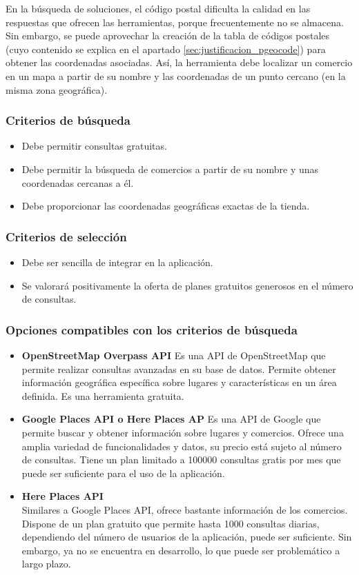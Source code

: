 En la búsqueda de soluciones, el código postal dificulta la calidad en las respuestas que ofrecen las herramientas, porque frecuentemente no se almacena. Sin embargo, se puede aprovechar la creación de la tabla de códigos postales (cuyo contenido se explica en el apartado \ref{sec:justificacion_pgeocode}) para obtener las coordenadas asociadas. Así, la herramienta debe localizar un comercio en un mapa a partir de su nombre y las coordenadas de un punto cercano (en la misma zona geográfica).

\subsubsection{Criterios de búsqueda}
\begin{itemize}
    \item Debe permitir consultas gratuitas.
    \item Debe permitir la búsqueda de comercios a partir de su nombre y unas coordenadas cercanas a él.
    \item Debe proporcionar las coordenadas geográficas exactas de la tienda.
\end{itemize}

\subsubsection{Criterios de selección}
\begin{itemize}
    \item Debe ser sencilla de integrar en la aplicación.
    \item Se valorará positivamente la oferta de planes gratuitos generosos en el número de consultas.
\end{itemize}

\subsubsection{Opciones compatibles con los criterios de búsqueda}
\begin{itemize}
    \item \textbf{OpenStreetMap Overpass API}
    Es una API de OpenStreetMap que permite realizar consultas avanzadas en su base de datos. Permite obtener información geográfica específica sobre lugares y características en un área definida. Es una herramienta gratuita.
    \item \textbf{Google Places API o Here Places AP}
    Es una API de Google que permite buscar y obtener información sobre lugares y comercios. Ofrece una amplia variedad de funcionalidades y datos, su precio está sujeto al número de consultas. Tiene un plan limitado a 100000 consultas gratis por mes que puede ser suficiente para el uso de la aplicación\cite{google_places_api}.
    \item \textbf{Here Places API}\\
    Similares a Google Places API, ofrece bastante información de los comercios. Dispone de un plan gratuito que permite hasta 1000 consultas diarias, dependiendo del número de usuarios de la aplicación, puede ser suficiente. Sin embargo, ya no se encuentra en desarrollo, lo que puede ser problemático a largo plazo\cite{here_places_api}.
\end{itemize}

